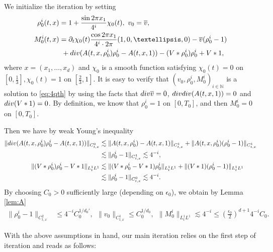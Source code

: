 \documentclass[10pt,a4paper]{amsart}
\numberwithin{equation}{section}
\def\mN{{\mathbb N}}
\def\leq{\leqslant}
\def\div{\mathord{{\rm div}}}
\def\leq{\leqslant}
\def\div{\mathord{{\rm div}}}
\begin{document}
We initialize the iteration by setting
\begin{align*}
\rho_0^i(t,x)
&=
1+\frac{\sin2\pi x_1}{4^i}\chi_0(t),
 \ 
v_0=\overline v,\\
M_0^i(t,x)
&=
\partial_t\chi_0(t)\frac{\cos2\pi x_1}{4^i\cdot 2\pi}(1,0,\dots,0)
-\overline v(\rho_0^i-1)\\
&\ +
\div(A(t,x,\rho_0^i) \rho_0^i-A(t,x,1))-(V*\rho_0^i)\rho_0^i+V*1,
\end{align*}
where $x=(x_1,\dots,x_d)$ and $\chi_0$ is a smooth function satisfying
$
\chi_0(t)=0 $ on $
 [0,\frac13 ], \chi_0(t)=1$ on $[\frac23,1 ].
$   It is easy to verify that $(v_0,\rho^{i}_0,  M^{i}_0)_{i\in\mN}$ is a solution to \eqref{eq:4qth} by using the facts that $\div \overline v=0$, $\div\div(A(t,x,1))=0$ and $\div(V*1)=0$. By definition, we know that $\rho_0^i=1$ on $[0,T_0]$, and then $M_0^i=0$ on $[0,T_0]$.

Then   we have by weak Young's inequality
\begin{align*}
  \|  \div(A(t,x,\rho_0^i) \rho_0^i-A(t,x,1))\|_{C_{t,x}^0}&\lesssim \|   A(t,x,\rho_0^i) -A(t,x,1)\|_{C_{t,x}^1}+\|  A(t,x,\rho_0^i) (\rho_0^i-1) \|_{C_{t,x}^1}\\
  &\lesssim \|\rho_0^i-1 \|_{C_{t,x}^1}\lesssim 4^{-i},\\
\|(V*\rho_0^i)\rho_0^i-V*1\|_{L_{t}^1L^1}&\lesssim \|(V*\rho_0^i-V*1)\rho_0^i\|_{L_{t}^1L^1}+\|( V*1)(\rho_0^i-1)\|_{L_{t}^1L^1}\\
&\lesssim \|\rho_0^i-1 \|_{C_{t,x}^0}\lesssim 4^{-i}.
\end{align*} By choosing $C_0>0$ sufficiently large (depending on $\epsilon_0$), we obtain by Lemma \ref{lem:A}
\begin{align}
\| \rho_0^i-1\|_{C_{t,x}^2}
& 
\leq
4^{-i}C_0^{1/d_0'},\ \ \|v_0\|_{C_{t,x}^1}\leq C_0^{1/d_0},
\ \
\|M_0^i\|_{L_t^1L^1}
\lesssim
4^{-i}
\leq
(\frac{\epsilon_0}{2})^{d+1}4^{-i}C_0.
\label{bd:4rho_0,M_0}
\end{align} 

 

With the above assumptions in hand, our main iteration relies on the first step of iteration and reads as follows:
\end{document}
